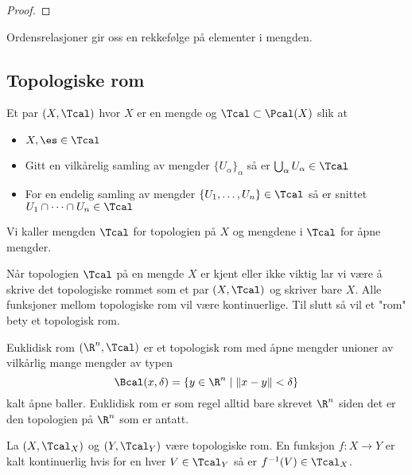 \begin{proof}
\end{proof}

Ordensrelasjoner gir oss en rekkefølge på elementer i mengden. 

\subsection{Topologiske rom}\label{Sec:Top}
\begin{definition}\label{Def:TopRom}
    Et par $(X,\Tcal)$ hvor $X$ er en mengde og $\Tcal\subset\Pcal(X)$ slik at 
    \begin{itemize}
        \item $X,\es\in\Tcal$
        \item Gitt en vilkårelig samling av mengder $\{U_\alpha\}_{\alpha}$ så er $\bigcup_\alpha U_\alpha\in\Tcal$
        \item For en endelig samling av mengder $\{U_1,\dots,U_n\}\in\Tcal$ så er snittet $U_1\cap\dots\cap U_n\in\Tcal$
    \end{itemize}
    Vi kaller mengden $\Tcal$ for topologien på $X$ og mengdene i $\Tcal$ for åpne mengder.
\end{definition}

Når topologien $\Tcal$ på en mengde $X$ er kjent eller ikke viktig lar vi være å skrive det topologiske rommet som et par $(X,\Tcal)$ og skriver bare $X$. Alle funksjoner mellom topologiske rom vil være kontinuerlige. Til slutt så vil et "rom" bety et topologisk rom.

\begin{example}\label{Ex:EukTRom}
    Euklidisk rom $(\R^n,\Tcal)$ er et topologisk rom med åpne mengder unioner av vilkårlig mange mengder av typen
    \[\Bcal(x,\delta) = \{y\in\R^n\;|\; \|x-y\|<\delta\}\]
    kalt åpne baller. Euklidisk rom er som regel alltid bare skrevet $\R^n$ siden det er den topologien på $\R^n$ som er antatt.
\end{example}

\begin{definition}\label{Def:KontFunk}
    La $(X,\Tcal_X)$ og $(Y,\Tcal_Y)$ være topologiske rom. En funksjon $f: X\to Y$ er kalt kontinuerlig hvis for en hver \(V\in\Tcal_Y\) så er \(f^{-1}(V)\in\Tcal_X\).
\end{definition}

